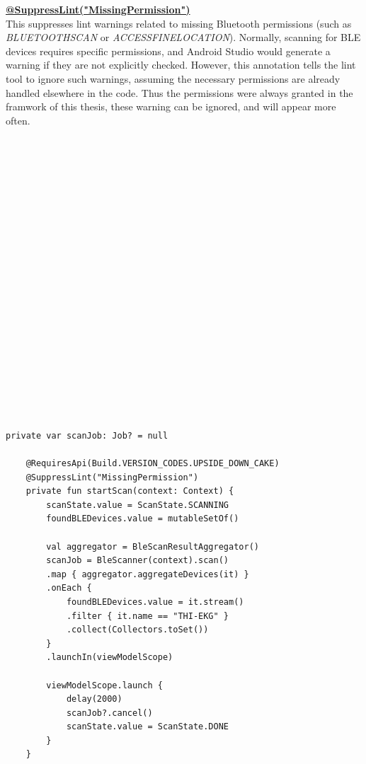 {	\textbf{\underline{@SuppressLint("MissingPermission")  }}\\
	This suppresses lint warnings related to missing Bluetooth permissions (such as \textit{BLUETOOTH\textunderscore SCAN} or \textit{ACCESS\textunderscore FINE\textunderscore LOCATION}). Normally, scanning for BLE devices requires specific permissions, and Android Studio would generate a warning if they are not explicitly checked. However, this annotation tells the lint tool to ignore such warnings, assuming the necessary permissions are already handled elsewhere in the code. Thus the permissions were always granted in the framwork of this thesis, these warning can be ignored, and will appear more often. 
	\mbox{}\\
	\mbox{}\\
	\mbox{}\\
	\mbox{}\\
	\mbox{}\\
	\mbox{}\\
	\mbox{}\\
	\mbox{}\\
	\mbox{}\\\\
	\mbox{}\\
	\mbox{}\\
	\mbox{}\\
	\mbox{}\\
	\mbox{}\\
	\mbox{}\\
	\mbox{}\\
	\mbox{}\\
	\mbox{}\\
	\mbox{}\\
	\mbox{}\\
	\mbox{}\\
	\begin{lstlisting}[label={fig:simpleSourceGen.cs}, caption={Code for scanning functionality}]
	private var scanJob: Job? = null
	
	@RequiresApi(Build.VERSION_CODES.UPSIDE_DOWN_CAKE)
	@SuppressLint("MissingPermission")
	private fun startScan(context: Context) {
		scanState.value = ScanState.SCANNING
		foundBLEDevices.value = mutableSetOf()
		
		val aggregator = BleScanResultAggregator()
		scanJob = BleScanner(context).scan()
		.map { aggregator.aggregateDevices(it) }
		.onEach {
			foundBLEDevices.value = it.stream()
			.filter { it.name == "THI-EKG" }
			.collect(Collectors.toSet())
		}
		.launchIn(viewModelScope)
		
		viewModelScope.launch {
			delay(2000)
			scanJob?.cancel()
			scanState.value = ScanState.DONE
		}
	}
	\end{lstlisting}
	
	
}
